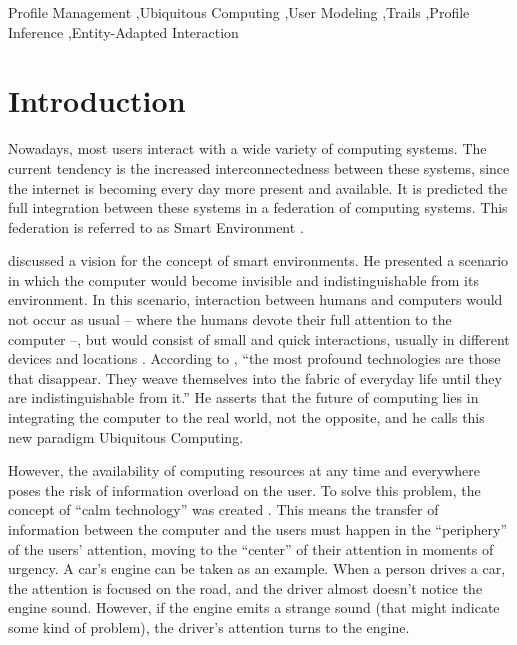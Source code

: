 \documentclass[preprint,authoryear,12pt,dvipdfm]{elsarticle}
\begin{document}
\begin{frontmatter}
\begin{keyword}

Profile Management \sep Ubiquitous Computing \sep User Modeling \sep Trails \sep Profile Inference  \sep Entity-Adapted Interaction

\end{keyword}

\end{frontmatter}


\section{Introduction}
\label{ch:introducao}

Nowadays, most users interact with a wide variety of computing systems. The current tendency is the increased interconnectedness between these systems, since the internet is becoming every day more present and available. It is predicted the full integration between these systems in a federation of computing systems. This federation is referred to as Smart Environment \citep{heckmann05,augusto10}.

\citet{weiser91} discussed a vision for the concept of smart environments. He
presented a scenario in which the computer would become invisible and
indistinguishable from its environment. In this scenario, interaction between
humans and computers would not occur as usual -- where the humans devote their
full attention to the computer --, but would consist of small and quick
interactions, usually in different devices and locations \citep{weiser96}.
According to \citet{weiser91}, ``the most profound technologies are those that
disappear. They weave themselves into the fabric of everyday life until they
are indistinguishable from it.'' He asserts that the future
of computing lies in integrating the computer to the real world, not the
opposite, and he calls this new paradigm Ubiquitous Computing.

However, the availability of computing resources at any time and everywhere
poses the risk of information overload on the user. To solve this problem, the
concept of ``calm technology'' was created \citep{weiser96}. This means the
transfer of information between the computer and the users must happen in the
``periphery'' of the users' attention, moving to the ``center'' of their
attention in moments of urgency. A car's engine can be taken as an example. When
a person drives a car, the attention is focused on the road, and the driver almost doesn't notice the engine sound. However, if the engine emits a strange sound (that might indicate some kind of problem), the driver's attention turns to the engine.
\end{document}
